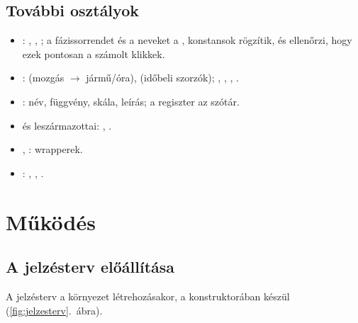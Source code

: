\documentclass[11pt,a4paper]{article}
\begin{document}
\subsection{További osztályok}

\begin{itemize}
  \item {}: , , ; a fázissorrendet és a
        neveket a ,  konstansok rögzítik, és ellenőrzi, hogy ezek
        pontosan a számolt klikkek.
  \item {}:  (mozgás $\to$ jármű/óra),  (időbeli szorzók);
        , , , .
  \item {}: név, függvény, skála, leírás; a regiszter az  szótár.
  \item {} és leszármazottai: , .
  \item {}, :  wrapperek.
  \item {}: , , .
\end{itemize}

\section{Működés}

\subsection{A jelzésterv előállítása}

A jelzésterv a környezet létrehozásakor, a  konstruktorában készül
(\ref{fig:jelzesterv}.~ábra).
\end{document}
